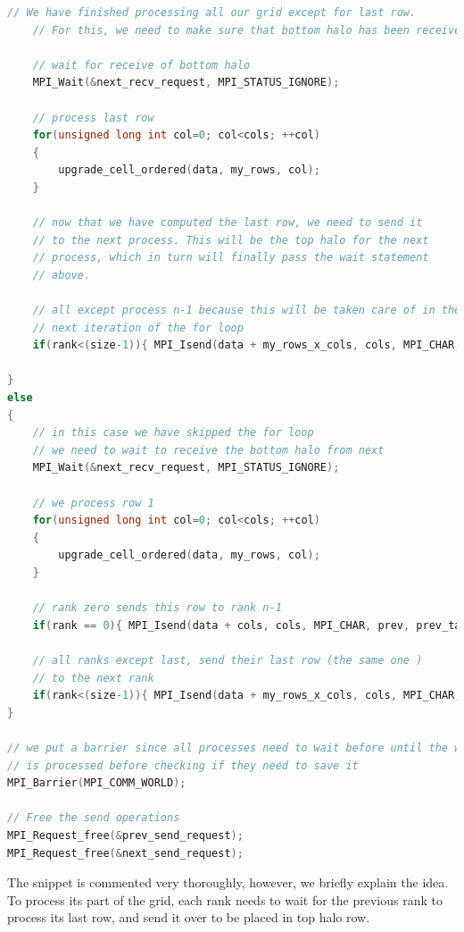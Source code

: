 \documentclass{report}
\begin{document}
\begin{lstlisting}[language=C++]
    // We have finished processing all our grid except for last row. 
    // For this, we need to make sure that bottom halo has been received.

    // wait for receive of bottom halo
    MPI_Wait(&next_recv_request, MPI_STATUS_IGNORE);

    // process last row
    for(unsigned long int col=0; col<cols; ++col)
    {
        upgrade_cell_ordered(data, my_rows, col);
    }

    // now that we have computed the last row, we need to send it 
    // to the next process. This will be the top halo for the next 
    // process, which in turn will finally pass the wait statement 
    // above.
    
    // all except process n-1 because this will be taken care of in the 
    // next iteration of the for loop
    if(rank<(size-1)){ MPI_Isend(data + my_rows_x_cols, cols, MPI_CHAR, next, next_tag, MPI_COMM_WORLD, &next_send_request);}

}
else
{
    // in this case we have skipped the for loop
    // we need to wait to receive the bottom halo from next
    MPI_Wait(&next_recv_request, MPI_STATUS_IGNORE);
    
    // we process row 1
    for(unsigned long int col=0; col<cols; ++col)
    {
        upgrade_cell_ordered(data, my_rows, col);
    }

    // rank zero sends this row to rank n-1
    if(rank == 0){ MPI_Isend(data + cols, cols, MPI_CHAR, prev, prev_tag, MPI_COMM_WORLD, &prev_send_request);}

    // all ranks except last, send their last row (the same one )
    // to the next rank
    if(rank<(size-1)){ MPI_Isend(data + my_rows_x_cols, cols, MPI_CHAR, next, next_tag, MPI_COMM_WORLD, &next_send_request);}
}

// we put a barrier since all processes need to wait before until the whole grid 
// is processed before checking if they need to save it
MPI_Barrier(MPI_COMM_WORLD);

// Free the send operations
MPI_Request_free(&prev_send_request);
MPI_Request_free(&next_send_request);

\end{lstlisting}

The snippet is commented very thoroughly, however, we briefly explain the idea. 
To process its part of the grid, each rank needs to wait for the previous rank 
to process its last row, and send it over to be placed in top halo row. 
\end{document}

